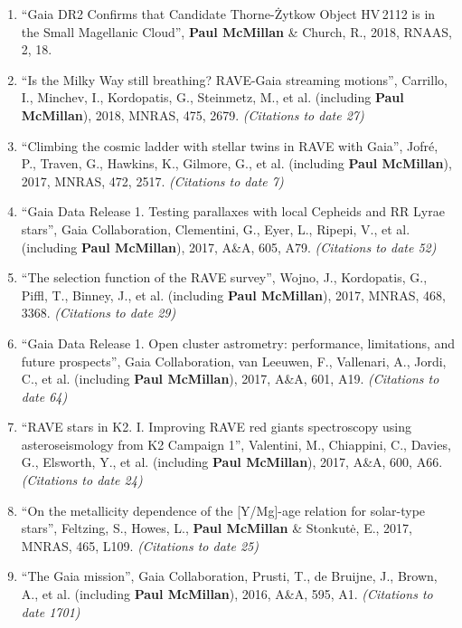 \documentclass{resume}
\begin{document}
\begin{enumerate}
\item ``Gaia DR2 Confirms that Candidate Thorne-\.Zytkow Object HV\,2112 is in the Small Magellanic Cloud'', \textbf{Paul McMillan} \& Church, R., 2018, RNAAS, 2, 18.

\item ``Is the Milky Way still breathing? RAVE-Gaia streaming motions'', Carrillo, I., Minchev, I., Kordopatis, G., Steinmetz, M., et al. (including \textbf{Paul McMillan}), 2018, MNRAS, 475, 2679. \textit{(Citations to date 27)}

\item ``Climbing the cosmic ladder with stellar twins in RAVE with Gaia'', Jofr\'e, P., Traven, G., Hawkins, K., Gilmore, G., et al. (including \textbf{Paul McMillan}), 2017, MNRAS, 472, 2517. \textit{(Citations to date 7)}

\item ``Gaia Data Release 1. Testing parallaxes with local Cepheids and RR Lyrae stars'', Gaia Collaboration, Clementini, G., Eyer, L., Ripepi, V., et al. (including \textbf{Paul McMillan}), 2017, A\&A, 605, A79. \textit{(Citations to date 52)}

\item ``The selection function of the RAVE survey'', Wojno, J., Kordopatis, G., Piffl, T., Binney, J., et al. (including \textbf{Paul McMillan}), 2017, MNRAS, 468, 3368. \textit{(Citations to date 29)}

\item ``Gaia Data Release 1. Open cluster astrometry: performance, limitations, and future prospects'', Gaia Collaboration, van Leeuwen, F., Vallenari, A., Jordi, C., et al. (including \textbf{Paul McMillan}), 2017, A\&A, 601, A19. \textit{(Citations to date 64)}

\item ``RAVE stars in K2. I. Improving RAVE red giants spectroscopy using asteroseismology from K2 Campaign 1'', Valentini, M., Chiappini, C., Davies, G., Elsworth, Y., et al. (including \textbf{Paul McMillan}), 2017, A\&A, 600, A66. \textit{(Citations to date 24)}

\item ``On the metallicity dependence of the [Y/Mg]-age relation for solar-type stars'', Feltzing, S., Howes, L., \textbf{Paul McMillan} \& Stonkut\.{e}, E., 2017, MNRAS, 465, L109. \textit{(Citations to date 25)}

\item ``The Gaia mission'', Gaia Collaboration, Prusti, T., de Bruijne, J., Brown, A., et al. (including \textbf{Paul McMillan}), 2016, A\&A, 595, A1. \textit{(Citations to date 1701)}


\end{enumerate}
\end{document}
